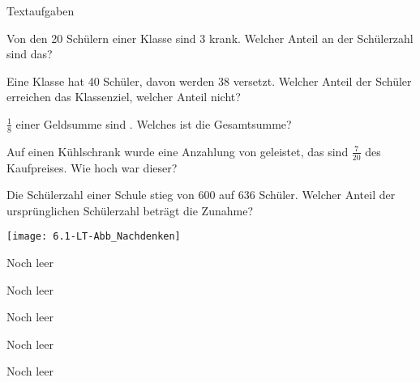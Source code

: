 \documentclass[12pt,a5paper,landscape]{scrartcl}
\begin{document}
	\begin{karte2}[\symEinzel]{Textaufgaben}
		\begin{minipage}{\textwidth-4.5cm}
			\begin{enumeratea}
				\item Von den 20 Schülern einer Klasse sind 3 krank. Welcher Anteil an der Schülerzahl sind das?
				
				\item Eine Klasse hat 40 Schüler, davon werden 38 versetzt. Welcher Anteil der Schüler erreichen das Klassenziel, welcher Anteil nicht?
				
				\item $\tfrac{1}{8}$ einer Geldsumme sind . Welches ist die Gesamtsumme?
				
				\item Auf einen Kühlschrank wurde eine Anzahlung von  geleistet, das sind $\tfrac{7}{20}$ des Kaufpreises. Wie hoch war dieser?
				
				\item Die Schülerzahl einer Schule stieg von 600 auf 636 Schüler. Welcher Anteil der ursprünglichen Schülerzahl beträgt die Zunahme?
			\end{enumeratea}
		\end{minipage}\hfill\begin{minipage}{4cm}
			\texttt{[image: 6.1-LT-Abb\_Nachdenken]}
		\end{minipage}
	\end{karte2}
	
	\leereKarte
	
	\begin{karte1}{Noch leer}
	\end{karte1}
	
	\begin{karte1}{Noch leer}
	\end{karte1}
	
	\begin{karte1}{Noch leer}
	\end{karte1}
	
	\begin{karte1}{Noch leer}
	\end{karte1}
	
	\begin{karte1}{Noch leer}
	\end{karte1}
	
\end{document}
